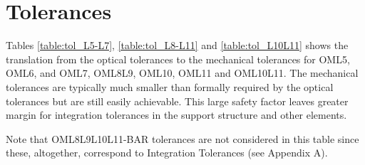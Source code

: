 \documentclass{report}
\begin{document}
\section{Tolerances}


Tables \ref{table:tol_L5-L7}, \ref{table:tol_L8-L11} and \ref{table:tol_L10L11} shows the translation from the optical tolerances to the mechanical tolerances for OML5, OML6, and OML7, OML8L9, OML10, OML11 and OML10L11. The mechanical tolerances are typically much smaller than formally required by the optical tolerances but are still easily achievable. This large safety factor leaves greater margin for integration tolerances in the support structure and other elements.

Note that OML8L9L10L11-BAR tolerances are not considered in this table since these, altogether, correspond to Integration Tolerances (see Appendix A).
\end{document}
